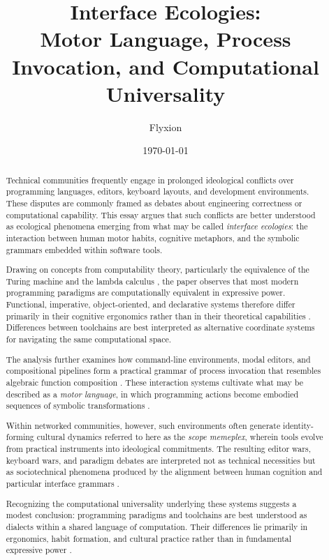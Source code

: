 \documentclass[12pt]{article}
\title{Interface Ecologies:\\
\large Motor Language, Process Invocation, and Computational Universality}
\author{Flyxion}
\date{\today}
\theoremstyle{definition}
\begin{document}
\maketitle

\begin{abstract}

Technical communities frequently engage in prolonged ideological
conflicts over programming languages, editors, keyboard layouts, and
development environments. These disputes are commonly framed as debates
about engineering correctness or computational capability. This essay
argues that such conflicts are better understood as ecological
phenomena emerging from what may be called \emph{interface ecologies}:
the interaction between human motor habits, cognitive metaphors, and
the symbolic grammars embedded within software tools.

Drawing on concepts from computability theory, particularly the
equivalence of the Turing machine and the lambda calculus
\cite{church1936,turing1936}, the paper observes that most modern
programming paradigms are computationally equivalent in expressive power.
Functional, imperative, object-oriented, and declarative systems
therefore differ primarily in their cognitive ergonomics rather than in
their theoretical capabilities \cite{backus1978}. Differences between
toolchains are best interpreted as alternative coordinate systems for
navigating the same computational space.

The analysis further examines how command-line environments, modal
editors, and compositional pipelines form a practical grammar of
process invocation that resembles algebraic function composition
\cite{fant2006,ritchie1974}. These interaction systems cultivate what
may be described as a \emph{motor language}, in which programming
actions become embodied sequences of symbolic transformations
\cite{norman1988}.

Within networked communities, however, such environments often generate
identity-forming cultural dynamics referred to here as the
\emph{scope memeplex}, wherein tools evolve from practical instruments
into ideological commitments. The resulting editor wars, keyboard wars,
and paradigm debates are interpreted not as technical necessities but
as sociotechnical phenomena produced by the alignment between human
cognition and particular interface grammars \cite{raymond2003}.

Recognizing the computational universality underlying these systems
suggests a modest conclusion: programming paradigms and toolchains are
best understood as dialects within a shared language of computation.
Their differences lie primarily in ergonomics, habit formation, and
cultural practice rather than in fundamental expressive power
\cite{kleene1952}.

\end{abstract}
\end{document}
